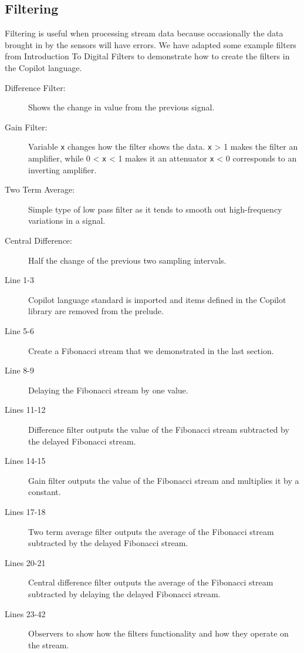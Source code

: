 \subsection{Filtering} \label{sec:filter}

Filtering is useful when processing stream data because occasionally the data
brought in by the sensors will have errors. We have adapted some example filters
from Introduction To Digital Filters \cite{Tyson2013} to demonstrate how to create the filters in the Copilot
language.
\begin{description}
 \item[Difference Filter:] Shows the change in value from the previous signal.
 \item[Gain Filter:]  Variable {\tt x} changes how the filter shows the data. {\tt x} \textgreater{} 1 makes the filter an amplifier, while 0 \textless{} {\tt x} \textless{} 1 makes it an attenuator {\tt x} \textless{} 0 corresponds to an inverting amplifier. 
 \item[Two Term Average:] Simple type of low pass filter as it tends to smooth out high-frequency variations in a signal.
 \item[Central Difference:] Half the change of the previous two sampling intervals. 
\end{description} 
%

%

\begin{description}
  \item[Line 1-3] Copilot language standard is imported and
  items defined in the Copilot library are removed from the prelude.
  \item[Line 5-6] Create a Fibonacci stream that we demonstrated in the last section.
  \item[Line 8-9] Delaying the Fibonacci stream by one value.
  \item[Lines 11-12] Difference filter outputs the value of the Fibonacci stream subtracted by the delayed Fibonacci stream. 
  \item[Lines 14-15] Gain filter outputs the value of the Fibonacci stream and multiplies it by a constant.
  \item[Lines 17-18] Two term average filter outputs the average of the Fibonacci stream subtracted by the delayed Fibonacci stream. 
  \item[Lines 20-21] Central difference filter outputs the average of the Fibonacci stream subtracted by delaying the delayed Fibonacci stream. 
  \item[Lines 23-42] Observers to show how the filters functionality and how they operate on the stream. 

\end{description}

